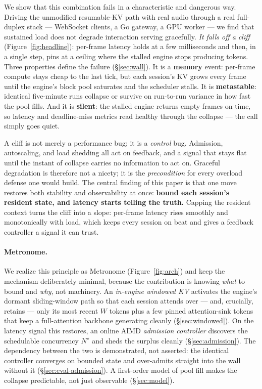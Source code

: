 We show that this combination fails in a characteristic and dangerous way. Driving the unmodified
resumable-KV path with real audio through a real full-duplex stack --- WebSocket clients, a Go
gateway, a GPU worker --- we find that sustained load does not degrade interaction serving gracefully. \emph{It falls
off a cliff} (Figure~\ref{fig:headline}): per-frame latency holds at a few milliseconds and then, in a
single step, pins at a ceiling where the stalled engine stops producing tokens. Three properties define
the failure (\S\ref{sec:wall}). It is a \textbf{memory} event: per-frame compute stays cheap to the
last tick, but each session's KV grows every frame until the engine's block pool saturates and the
scheduler stalls. It is \textbf{metastable}: identical five-minute runs collapse or survive on run-to-run
variance in how fast the pool fills. And it is \textbf{silent}: the stalled engine returns empty frames
on time, so latency and deadline-miss metrics read healthy through the collapse --- the call simply goes quiet.

A cliff is not merely a performance bug; it is a \emph{control} bug. Admission, autoscaling, and load
shedding all act on feedback, and a signal that stays flat until the instant of collapse carries no
information to act on. Graceful degradation is therefore not a nicety; it is the \emph{precondition} for
every overload defense one would build. The central finding of this paper is that one move restores both
stability and observability at once: \textbf{bound each session's resident state, and latency starts
telling the truth.} Capping the resident context turns the cliff into a slope: per-frame latency rises
smoothly and monotonically with load, which keeps every session on beat and gives a feedback controller
a signal it can trust.

\paragraph{Metronome.} We realize this principle as Metronome (Figure~\ref{fig:arch}) and keep the
mechanism deliberately minimal, because the contribution is knowing \emph{what} to bound and \emph{why},
not machinery. An \emph{in-engine windowed KV} activates the engine's dormant sliding-window path so
that each session attends over --- and, crucially, retains --- only its most recent $W$ tokens plus a
few pinned attention-sink tokens that keep a full-attention backbone generating cleanly
(\S\ref{sec:windowed}). On the latency signal this restores, an online
AIMD \emph{admission controller} discovers the schedulable concurrency $N^\star$ and sheds the surplus
cleanly (\S\ref{sec:admission}). The dependency between the two is demonstrated, not asserted: the
identical controller converges on bounded state and over-admits straight into the wall without it
(\S\ref{sec:eval-admission}). A first-order model of pool fill makes the collapse predictable, not
just observable (\S\ref{sec:model}).

